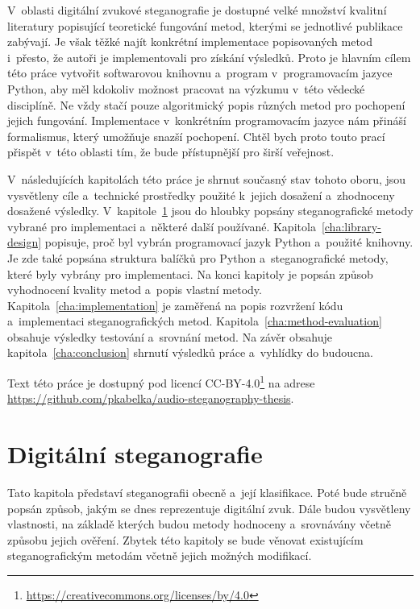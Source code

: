 V~oblasti digitální zvukové steganografie je dostupné velké množství kvalitní
literatury popisující teoretické fungování metod, kterými se jednotlivé
publikace zabývají. Je však těžké najít konkrétní implementace popisovaných
metod i~přesto, že autoři je implementovali pro získání výsledků. Proto je
hlavním cílem této práce vytvořit softwarovou knihovnu a~program
v~programovacím jazyce Python, aby měl kdokoliv možnost pracovat na výzkumu
v~této vědecké disciplíně. Ne vždy stačí pouze algoritmický popis různých metod
pro pochopení jejich fungování. Implementace v~konkrétním programovacím jazyce
nám přináší formalismus, který umožňuje snazší pochopení. Chtěl bych proto
touto prací přispět v~této oblasti tím, že bude přístupnější pro širší
veřejnost.

V~následujících kapitolách této práce je shrnut současný stav tohoto oboru,
jsou vysvětleny cíle a~technické prostředky použité k~jejich dosažení
a~zhodnoceny dosažené výsledky. V~kapitole~\ref{cha:digital-steganography} jsou
do hloubky popsány steganografické metody vybrané pro implementaci a~některé
další používané. Kapitola~\ref{cha:library-design} popisuje, proč byl vybrán
programovací jazyk Python a~použité knihovny. Je zde také popsána struktura
balíčků pro Python a~steganografické metody, které byly vybrány pro
implementaci. Na konci kapitoly je popsán způsob vyhodnocení kvality metod
a~popis vlastní metody. Kapitola~\ref{cha:implementation} je zaměřená na popis
rozvržení kódu a~implementaci steganografických metod.
Kapitola~\ref{cha:method-evaluation} obsahuje výsledky testování a~srovnání
metod. Na závěr obsahuje kapitola~\ref{cha:conclusion} shrnutí výsledků práce
a~vyhlídky do budoucna.

Text této práce je dostupný pod licencí
CC-BY-4.0\footnote{\url{https://creativecommons.org/licenses/by/4.0}} na adrese
\url{https://github.com/pkabelka/audio-steganography-thesis}.


\chapter{Digitální steganografie}
\label{cha:digital-steganography}

Tato kapitola představí steganografii obecně a~její klasifikace. Poté bude
stručně popsán způsob, jakým se dnes reprezentuje digitální zvuk. Dále budou
vysvětleny vlastnosti, na základě kterých budou metody hodnoceny a~srovnávány
včetně způsobu jejich ověření. Zbytek této kapitoly se bude věnovat existujícím
steganografickým metodám včetně jejich možných modifikací.

